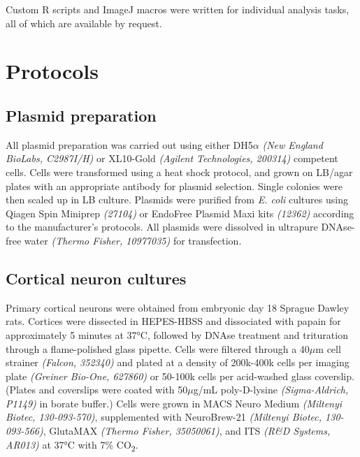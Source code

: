 \documentclass[
  12pt,
  a4paper,
]{book}
\begin{document}
Custom R scripts and ImageJ macros were written for individual analysis tasks, all of which are available by request.

\hypertarget{protocols}{%
\section{Protocols}\label{protocols}}

\hypertarget{plasmid-prep}{%
\subsection{Plasmid preparation}\label{plasmid-prep}}

All plasmid preparation was carried out using either DH5\(\alpha\) \emph{(New England BioLabs, C2987I/H)} or XL10-Gold \emph{(Agilent Technologies, 200314)} competent cells. Cells were transformed using a heat shock protocol, and grown on LB/agar plates with an appropriate antibody for plasmid selection. Single colonies were then scaled up in LB culture. Plasmids were purified from \emph{E. coli} cultures using Qiagen Spin Miniprep \emph{(27104)} or EndoFree Plasmid Maxi kits \emph{(12362)} according to the manufacturer's protocols. All plasmids were dissolved in ultrapure DNAse-free water \emph{(Thermo Fisher, 10977035)} for transfection.

\hypertarget{cortical-neuron-cultures}{%
\subsection{Cortical neuron cultures}\label{cortical-neuron-cultures}}

Primary cortical neurons were obtained from embryonic day 18 Sprague Dawley rats. Cortices were dissected in HEPES-HBSS and dissociated with papain for approximately 5 minutes at 37°C, followed by DNAse treatment and trituration through a flame-polished glass pipette. Cells were filtered through a 40\(\mu\)m cell strainer \emph{(Falcon, 352340)} and plated at a density of 200k-400k cells per imaging plate \emph{(Greiner Bio-One, 627860)} or 50-100k cells per acid-washed glass coverslip. (Plates and coverslips were coated with 50\(\mu\)g/mL poly-D-lysine \emph{(Sigma-Aldrich, P1149)} in borate buffer.) Cells were grown in MACS Neuro Medium \emph{(Miltenyi Biotec, 130-093-570)}, supplemented with NeuroBrew-21 \emph{(Miltenyi Biotec, 130-093-566)}, GlutaMAX \emph{(Thermo Fisher, 35050061)}, and ITS \emph{(R\&D Systems, AR013)} at 37°C with 7\% CO\textsubscript{2}.
\end{document}
